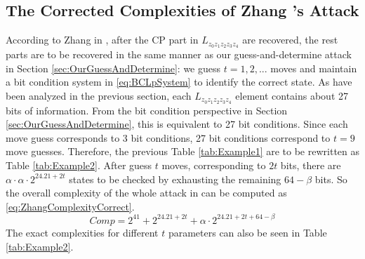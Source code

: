 \subsection{The Corrected Complexities of Zhang \etal's Attack}
According to Zhang \etal in \cite{AC:Zhang19}, after the CP part in $L_{z_0z_1z_2z_3z_4}$ are recovered, the rest parts are to be recovered in the same manner as our guess-and-determine attack in Section \ref{sec:OurGuessAndDetermine}: we guess $t=1,2,...$ moves and maintain a bit condition system in \eqref{eq:BCLpSystem} to identify the correct state. 
As have been analyzed in the previous section, each  $L_{z_0z_1z_2z_3z_4}$ element contains about 27 bits of information. 
From the bit condition perspective in Section \ref{sec:OurGuessAndDetermine}, this is equivalent to 27 bit conditions. 
Since each move guess corresponds to 3 bit conditions, 27 bit conditions correspond to $t=9$ move guesses. 
Therefore, the previous Table \ref{tab:Example1} are to be rewritten as Table \ref{tab:Example2}. 
After guess $t$ moves, corresponding to $2t$ bits, there are $\alpha \cdot \alpha \cdot 2^{24.21+2t}$ states to be checked by exhausting the remaining $64-\beta$ bits. 
So the overall complexity of the whole attack in \cite{AC:Zhang19} can be computed as \eqref{eq:ZhangComplexityCorrect}.
\begin{equation}\label{eq:ZhangComplexityCorrect}  
Comp=2^{41}+2^{24.21+2t}+\alpha \cdot 2^{24.21+2t+64-\beta}
\end{equation}
The exact complexities for different $t$ parameters can also be seen in Table \ref{tab:Example2}. 


